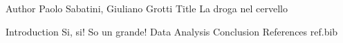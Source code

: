 Author Paolo Sabatini, Giuliano Grotti 
Title	La droga nel cervello
	
Introduction	Si, si! So un grande!
Data
Analysis
Conclusion
References ref.bib

